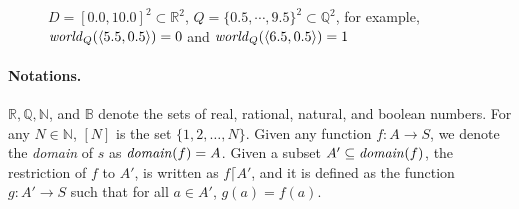 \begin{figure}[t]
\newcommand{\grid}[2]{\ensuremath{\langle#1,#2\rangle}}



\caption{$D = [0.0,10.0]^2 \subset \mathbb{R}^2$, $Q=\{0.5, \cdots, 9.5\}^2 \subset \mathbb{Q}^2$, for example, $\world_Q(\grid{5.5}{0.5}) = 0$ and $\world_Q(\grid{6.5}{0.5}) = 1$}
\end{figure}

\paragraph{Notations.}
$\mathbb{R}, \mathbb{Q},\mathbb{N}$, and $\mathbb{B}$ denote the sets of real, rational, natural, and boolean numbers.
For any $N \in \mathbb{N}$, $[N]$ is the set $\{1,2,\ldots,N\}$.
%
Given any function $f:A \rightarrow S$, we denote the {\em domain\/} of $s$ as $\mathit{domain}(f) = A$.
%
Given a subset $A' \subseteq \mathit{domain}(f)$, 
    the restriction of $f$ to $A'$, is written as $f \lceil A'$, and it is defined as the function $g:A' \rightarrow S$ such that for all $a \in A'$, $g(a) = f(a)$.

